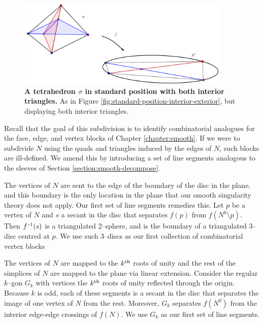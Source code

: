 \begin{figure}[h!]
	\centering
	\includegraphics[width=0.9\textwidth]{figures/standard-position-interior-interior.png}
	\caption{
		\textbf{A tetrahedron $\sigma$ in standard position with both interior triangles.}
		As in Figure \ref{fig:standard-position-interior-exterior}, but displaying both interior triangles.
	}
	\label{fig:standard-position-interior-interior}
\end{figure}

Recall that the goal of this subdivision is to identify combinatorial analogues for the face, edge, and vertex blocks of Chapter \ref{chapter:smooth}.
If we were to subdivide $N$ using the quads and triangles induced by the edges of $N$, such blocks are ill-defined.
We amend this by introducing a set of line segments analogous to the sleeves of Section \ref{section:smooth-decompose}.

The vertices of $N$ are sent to the edge of the boundary of the disc in the plane, and this boundary is the only location in the plane that our smooth singularity theory does not apply.
Our first set of line segments remedies this.
Let $p$ be a vertex of $N$ and $s$ a secant in the disc that separates $f(p)$ from $f(N^0\setminus{p})$.
Then $f^{\,\text{-}1}(s)$ is a triangulated 2--sphere, and is the boundary of a triangulated 3--disc centred at $p$.
We use such 3--discs as our first collection of combinatorial vertex blocks

The vertices of $N$ are mapped to the $k^{\text{th}}$ roots of unity and the rest of the simplices of $N$ are mapped to the plane via linear extension.
Consider the regular $k$--gon $G_k$ with vertices the $k^{\text{th}}$ roots of unity reflected through the origin.
Because $k$ is odd, each of these segments is a secant in the disc that separates the image of one vertex of $N$ from the rest.
Moreover, $G_k$ separates $f(N^0)$ from the interior edge-edge crossings of $f(N)$.
We use $G_k$ as our first set of line segments.

